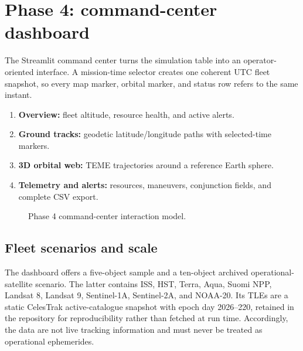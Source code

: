 \documentclass[11pt,a4paper]{article}
\begin{document}
\section{Phase 4: command-center dashboard}
The Streamlit command center turns the simulation table into an operator-oriented interface. A mission-time selector creates one coherent UTC fleet snapshot, so every map marker, orbital marker, and status row refers to the same instant.

\begin{enumerate}
 \item \textbf{Overview:} fleet altitude, resource health, and active alerts.
 \item \textbf{Ground tracks:} geodetic latitude/longitude paths with selected-time markers.
 \item \textbf{3D orbital web:} TEME trajectories around a reference Earth sphere.
 \item \textbf{Telemetry and alerts:} resources, maneuvers, conjunction fields, and complete CSV export.
\end{enumerate}

\begin{figure}[h]
\centering
{}
\caption{Phase 4 command-center interaction model.}
\end{figure}

\subsection{Fleet scenarios and scale}
The dashboard offers a five-object sample and a ten-object archived operational-satellite scenario. The latter contains ISS, HST, Terra, Aqua, Suomi NPP, Landsat 8, Landsat 9, Sentinel-1A, Sentinel-2A, and NOAA-20. Its TLEs are a static CelesTrak active-catalogue snapshot with epoch day 2026--220, retained in the repository for reproducibility rather than fetched at run time. Accordingly, the data are not live tracking information and must never be treated as operational ephemerides.
\end{document}
